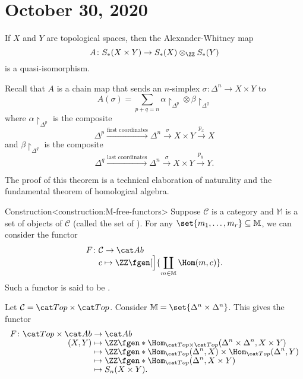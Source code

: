 \documentclass{standalone}
\begin{document}
\chapter{October 30, 2020}

\begin{theorem}
  If \(X\) and \(Y\) are topological spaces,
  then the Alexander-Whitney map
  \[
    A \colon S_*(X \times Y) \to S_*(X) \otimes_\ZZ S_*(Y)
  \]
  is a quasi-isomorphism.
\end{theorem}

Recall that \(A\) is a chain map that sends an \(n\)-simplex
\(\sigma \colon \Delta^n \to X \times Y\) to
\[
  A(\sigma) = \sum_{p + q = n} \alpha {\restriction}_{\Delta^p} \otimes
                               \beta  {\restriction}_{\Delta^q}
\]
where \(\alpha {\restriction}_{\Delta^p}\) is the composite
\[
  \Delta^p \xrightarrow{\text{first coordinates}}
  \Delta^n \overset\sigma\to
  X \times Y \overset{p_x}\to
  X
\]
and \(\beta {\restriction}_{\Delta^q}\) is the composite
\[
  \Delta^q \xrightarrow{\text{last coordinates}}
  \Delta^n \overset\sigma\to
  X \times Y \overset{p_y}\to
  Y.
\]

The proof of this theorem is a technical elaboration of
naturality and the fundamental theorem of homological algebra.

\begin{adhoctheorem}{Construction}<construction:M-free-functors>
  Suppose \(\mathcal C\) is a category and
          \(\mathbb M\) is a set of objects of \(\mathcal C\)
            (called the set of ).
  For any \(\set{m_1, \dots, m_r} \subseteq \mathbb M\),
  we can consider the functor
  \begin{align*}
    F \colon& \mathcal C \to \cAb \\[-1ex]
      & c \mapsto \ZZ\fgen[\Big]{\coprod_{m \in \mathbb M} \Hom(m, c)}.
  \end{align*}
  Such a functor is said to be .
\end{adhoctheorem}

\begin{example}
  Let \(\mathcal C = \cTop \times \cTop\).
  Consider \(\mathbb M = \set{\Delta^n \times \Delta^n}\).
  This gives the functor
  \begin{align*}
    F \colon \cTop \times \cAb &\to \cAb \\[-1ex]
      (X, Y) &\mapsto \ZZ\fgen*{
        \Hom_{\cTop \times \cTop}(\Delta^n \times \Delta^n, X \times Y)
      } \\[-1ex]
      &\mapsto \ZZ\fgen*{
        \Hom_{\cTop}(\Delta^n, X) \times \Hom_{\cTop}(\Delta^n, Y)
      } \\[-1ex]
      &\mapsto \ZZ\fgen*{\Hom_{\cTop}(\Delta^n, X \times Y)} \\[-1ex]
      &\mapsto S_n(X \times Y).
  \end{align*}
\end{example}
\end{document}
